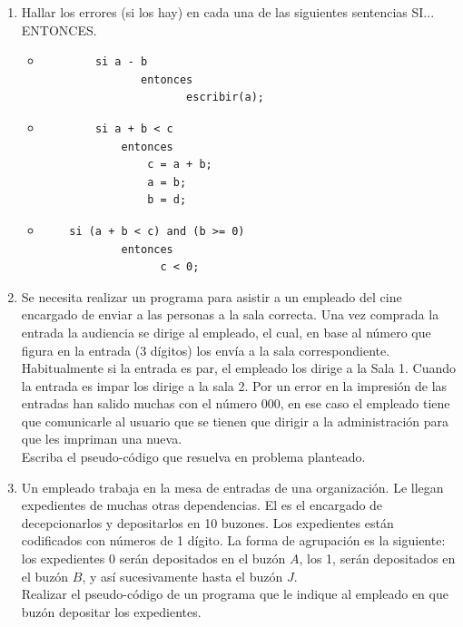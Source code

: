 \documentclass[a4paper,10pt]{article}
\begin{document}
\begin{enumerate}
\item Hallar los errores (si los hay) en cada una de las siguientes sentencias SI... ENTONCES.
    \begin{itemize}
\item[a-]
\begin{small}
\begin{verbatim}
        si a - b						
	           entonces						
		              escribir(a);						
\end{verbatim}
\end{small}					
\item[b-]
\begin{small}
\begin{verbatim}
        si a + b < c
            entonces
                c = a + b;
                a = b;
                b = d;
\end{verbatim}
\end{small}
\item[c-]
\begin{small}
\begin{verbatim}
	si (a + b < c) and (b >= 0)
	        entonces
		          c < 0;
\end{verbatim}
\end{small}
\end{itemize}


\item Se necesita realizar un programa para asistir a un empleado del cine encargado de enviar a las personas a la sala correcta. Una vez comprada la entrada la audiencia se dirige al empleado, el cual, en base al n\'umero que figura en la entrada (3 d\'igitos) los env\'ia a la sala correspondiente. Habitualmente si la entrada es par, el empleado los dirige a la Sala 1. Cuando la entrada es impar los dirige a la sala 2. Por un error en la impresi\'on de las entradas han salido muchas con el n\'umero 000, en ese caso el empleado tiene que comunicarle al usuario que se tienen que dirigir a la administraci\'on para que les impriman una nueva.\\
    
    Escriba el pseudo-c\'odigo que resuelva en problema planteado.

\item Un empleado trabaja en la mesa de entradas de una organizaci\'on. Le llegan expedientes de muchas otras dependencias. El es el encargado de decepcionarlos y depositarlos en 10 buzones. Los expedientes est\'an codificados con n\'umeros de 1 d\'igito. La forma de agrupaci\'on es la siguiente: los expedientes 0 ser\'an depositados en el buz\'on $A$, los 1, ser\'an depositados en el buz\'on $B$, y as\'i sucesivamente hasta el buz\'on $J$.\\
Realizar el pseudo-c\'odigo de un programa que le indique al empleado en que buz\'on depositar los expedientes.


\end{enumerate}
\end{document}
